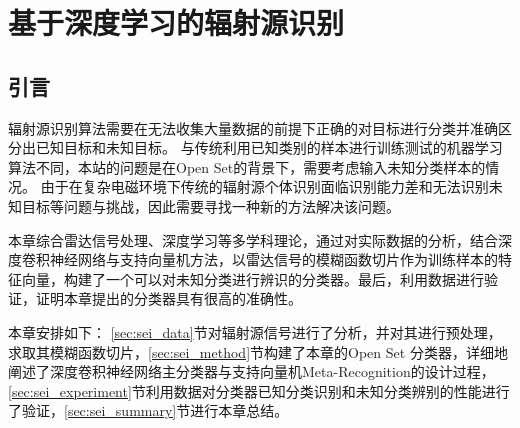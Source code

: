 
\chapter{基于深度学习的辐射源识别}
\label{sec:sei}




\section{引言}
辐射源识别算法需要在无法收集大量数据的前提下正确的对目标进行分类并准确区分出已知目标和未知目标。
与传统利用已知类别的样本进行训练测试的机器学习算法不同，本站的问题是在Open Set的背景下，需要考虑输入未知分类样本的情况。
由于在复杂电磁环境下传统的辐射源个体识别面临识别能力差和无法识别未知目标等问题与挑战，因此需要寻找一种新的方法解决该问题。

本章综合雷达信号处理、深度学习等多学科理论，通过对实际数据的分析，结合深度卷积神经网络与支持向量机方法，以雷达信号的模糊函数切片作为训练样本的特征向量，构建了一个可以对未知分类进行辨识的分类器。最后，利用数据进行验证，证明本章提出的分类器具有很高的准确性。

本章安排如下： \ref{sec:sei_data}节对辐射源信号进行了分析，并对其进行预处理，求取其模糊函数切片，\ref{sec:sei_method}节构建了本章的Open Set 分类器，详细地阐述了深度卷积神经网络主分类器与支持向量机Meta-Recognition的设计过程，\ref{sec:sei_experiment}节利用数据对分类器已知分类识别和未知分类辨别的性能进行了验证，\ref{sec:sei_summary}节进行本章总结。


